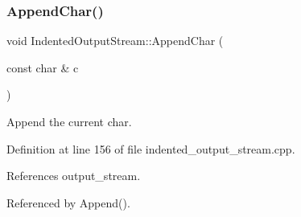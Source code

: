 \mbox{\label{classIndentedOutputStream_aae0d3f029caa08e9ce3b8107ded932b3}} 
\subsubsection{\texorpdfstring{Append\+Char()}{AppendChar()}}
{\footnotesize\ttfamily void Indented\+Output\+Stream\+::\+Append\+Char (\begin{DoxyParamCaption}\item[{const char \&}]{c }\end{DoxyParamCaption})\hspace{0.3cm}{\ttfamily [private]}}



Append the current char. 



Definition at line 156 of file indented\+\_\+output\+\_\+stream.\+cpp.



References output\+\_\+stream.



Referenced by Append().

